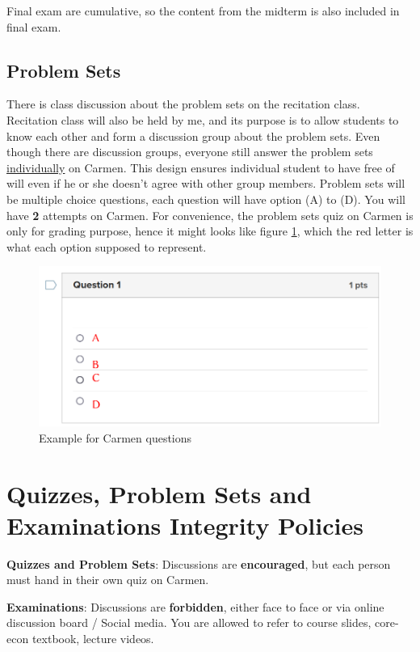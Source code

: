 \documentclass[12pt]{article}
\begin{document}
Final exam are cumulative, so the content from the midterm is also included in final exam.

\subsection*{Problem Sets}
\label{sub:Problem_Sets}

There is class discussion about the problem sets on the recitation class.
Recitation class will also be held by me, and its purpose is to allow students to know each other and form a discussion group about the problem sets.
Even though there are discussion groups, everyone still answer the problem sets \underline{individually} on Carmen.
This design ensures individual student to have free of will even if he or she doesn't agree with other group members.
Problem sets will be multiple choice questions, each question will have option (A) to (D).
You will have \textbf{2} attempts on Carmen.
For convenience, the problem sets quiz on Carmen is only for grading purpose, hence it might looks like figure \ref{fig:Carmen}, which the red letter is what each option supposed to represent.

\begin{figure}
    \centering
    \caption{Example for Carmen questions}
    \label{fig:Carmen}
    \includegraphics[width=\textwidth]{./figures/Carmen_Q_Example.png}
\end{figure}

\section*{Quizzes, Problem Sets and Examinations Integrity Policies}

\textbf{Quizzes and Problem Sets}: Discussions are \textbf{encouraged}, but each person must hand in their own quiz on Carmen.

\textbf{Examinations}: Discussions are \textbf{forbidden}, either face to face or via online discussion board / Social media. You are allowed to refer to course slides, core-econ textbook, lecture videos.
\end{document}
